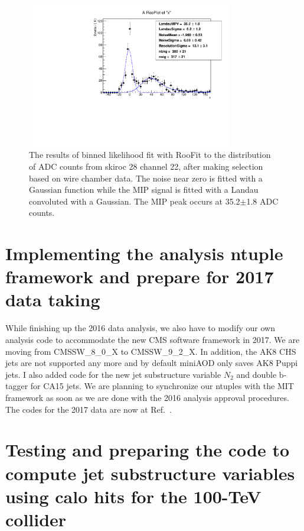 \begin{figure}[htbp]
   \centering
   \includegraphics[width=0.8\textwidth]{roofit_skiroc28_chan22.pdf}
   \caption{The results of binned likelihood fit with RooFit to the distribution of ADC counts from skiroc 28 channel 22, 
 after making selection based on wire chamber data. The noise near zero is fitted with a Gaussian function 
 while the MIP signal is fitted with a Landau convoluted with a Gaussian. The MIP peak 
 occurs at 35.2$\pm$1.8 ADC counts.}
   \label{fig:roofit}
\end{figure}


\section{Implementing the analysis ntuple framework and prepare for 2017 data taking}
 While finishing up the 2016 data analysis, we also have to modify our own 
analysis code to accommodate the new CMS software framework in 2017. We are 
moving from CMSSW\_8\_0\_X to CMSSW\_9\_2\_X. In addition, the AK8 CHS jets 
are not supported any more and by default miniAOD only saves AK8 Puppi jets. I 
also added code for the new jet substructure variable $N_2$ and double b-tagger 
for CA15 jets. We are planning to synchronize our ntuples with the MIT 
framework as soon as we are done with the 2016 analysis approval 
procedures. The codes for the 2017 data are now at Ref.~\cite{EikoCode}.

\section{Testing and preparing the code to compute jet substructure variables 
using calo hits for the 100-TeV collider}

